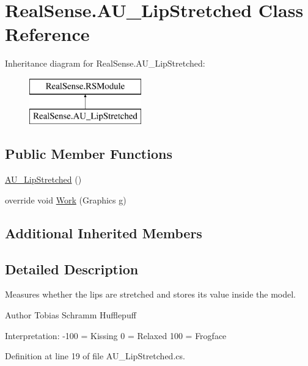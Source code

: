\hypertarget{class_real_sense_1_1_a_u___lip_stretched}{}\section{Real\+Sense.\+A\+U\+\_\+\+Lip\+Stretched Class Reference}
\label{class_real_sense_1_1_a_u___lip_stretched}
Inheritance diagram for Real\+Sense.\+A\+U\+\_\+\+Lip\+Stretched\+:\begin{figure}[H]
\begin{center}
\leavevmode
\includegraphics[height=2.000000cm]{class_real_sense_1_1_a_u___lip_stretched}
\end{center}
\end{figure}
\subsection*{Public Member Functions}
\begin{DoxyCompactItemize}
\item 
\hyperlink{class_real_sense_1_1_a_u___lip_stretched_aca5f1fcfb7f81dccdc700dfc025b4b39}{A\+U\+\_\+\+Lip\+Stretched} ()
\item 
override void \hyperlink{class_real_sense_1_1_a_u___lip_stretched_a2ec4542e5c8fa5585e66ee6ee44ab151}{Work} (Graphics g)
\end{DoxyCompactItemize}
\subsection*{Additional Inherited Members}


\subsection{Detailed Description}
Measures whether the lips are stretched and stores its\textquotesingle{} value inside the model. \begin{DoxyAuthor}{Author}
Tobias Schramm  Hufflepuff
\end{DoxyAuthor}
Interpretation\+: -\/100 = Kissing 0 = Relaxed 100 = Frogface 

Definition at line 19 of file A\+U\+\_\+\+Lip\+Stretched.\+cs.



